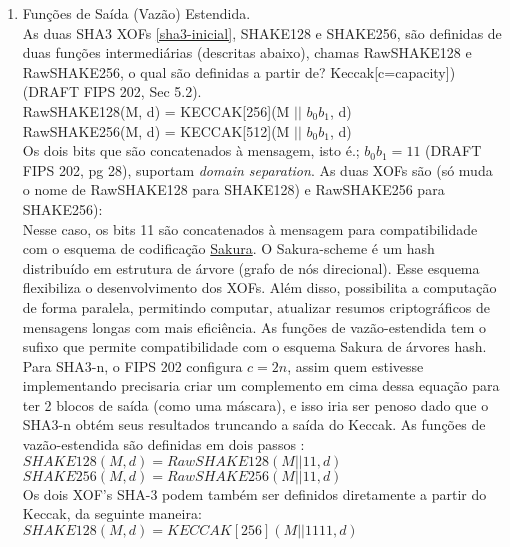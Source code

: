 \documentclass[12pt, a4paper]{article}
\begin{document}
\begin{enumerate}
\begin{enumerate}
\begin{enumerate}
\item Funções de Saída (Vazão) Estendida.\\

As duas SHA3 XOFs \ref{sha3-inicial}, SHAKE128 e SHAKE256, são definidas de duas
funções intermediárias (descritas abaixo), chamas RawSHAKE128 e RawSHAKE256, o
qual são definidas a partir de? Keccak[c=capacity]) (DRAFT FIPS 202, Sec 5.2).\\

RawSHAKE128(M, d) = KECCAK[256](M $||$ $b_{0}b_{1}$, d)\\

RawSHAKE256(M, d) = KECCAK[512](M $||$ $b_{0}b_{1}$, d)\\

Os dois bits que são concatenados à mensagem, isto é.; $b_{0}b_{1}=11$ (DRAFT
FIPS 202, pg 28), suportam \textit{domain separation}. As duas XOFs são (só
muda o nome de RawSHAKE128 para SHAKE128) e RawSHAKE256 para SHAKE256):\\

Nesse caso, os bits 11 são concatenados à mensagem para compatibilidade com o
esquema de codificação \underline{Sakura}. O Sakura-scheme é um hash distribuído
em estrutura de árvore (grafo de nós direcional)\cite{sakura}. Esse esquema
flexibiliza o desenvolvimento dos XOFs. Além disso, possibilita a computação de
forma paralela, permitindo computar, atualizar resumos criptográficos de
mensagens longas com mais eficiência. As funções de vazão-estendida tem o sufixo
que permite compatibilidade com o esquema Sakura de árvores hash. Para SHA3-n, o
FIPS 202 configura $c = 2n$, assim quem estivesse implementando precisaria criar
um complemento em cima dessa equação para ter 2 blocos de saída (como uma
máscara), e isso iria ser penoso dado que o SHA3-n obtém seus resultados
truncando a saída do Keccak. As funções de vazão-estendida são definidas em
dois passos \cite{sakura}:\\

$SHAKE128(M, d) = RawSHAKE128(M || 11, d)$\\

$SHAKE256(M, d) = RawSHAKE256(M || 11, d)$\\

Os dois XOF's SHA-3 podem também ser definidos diretamente a partir do Keccak,
da seguinte maneira:\\

$SHAKE128(M, d) = KECCAK[256] (M || 1111, d)$\\


\end{enumerate}
\end{enumerate}
\end{enumerate}
\end{document}
